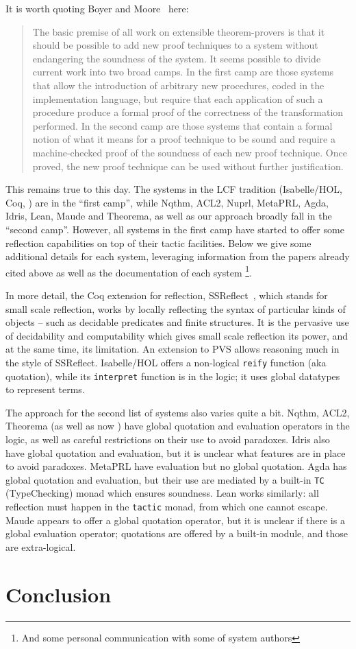\documentclass[fleqn]{llncs}
\begin{document}
It is worth quoting Boyer and Moore~\cite{BoyerMoore81} here:
\begin{quote}
The basic premise of all work on extensible
theorem-provers is that it should be possible to add new proof
techniques to a system without endangering the soundness of the system.
It seems possible to divide current work into two broad camps. In the
first camp are those systems that allow the introduction of arbitrary
new procedures, coded in the implementation language, but require that
each application of such a procedure produce a formal proof of the
correctness of the transformation performed. In the second camp are
those systems that contain a formal notion of what it means for a proof
technique to be sound and require a machine-checked proof of the
soundness of each new proof technique. Once proved, the new proof
technique can be used without further justification. 
\end{quote}
This remains true to this day. The systems in the LCF tradition (Isabelle/HOL,
Coq, \HL) are in the ``first camp'',
while Nqthm, ACL2, Nuprl, MetaPRL, Agda, Idris, Lean, Maude and Theorema, 
as well as our approach broadly fall in the ``second camp''. However,
all systems in the first camp have started to offer some reflection
capabilities on top of their tactic facilities. Below we give some 
additional details for each system, leveraging information from the papers 
already cited above as well as the documentation of each system%
\footnote{And some personal communication with some of system authors}.

In more detail, the Coq extension for reflection,
\textrm{SSReflect}~\cite{gonthier2010introduction}, which stands
for \textsf{small scale reflection}, works by locally reflecting
the syntax of particular kinds of objects -- such as decidable
predicates and finite structures.  It is the pervasive use of
decidability and computability which gives small scale reflection
its power, and at the same time, its limitation.  An extension to
PVS allows reasoning much in the style of \textrm{SSReflect}.
Isabelle/HOL offers a non-logical \texttt{reify} function (aka
quotation), while its \texttt{interpret} function is in the logic;
it uses global datatypes to represent \HL terms.

The approach for the second list of systems also varies quite a bit.
Nqthm, ACL2, Theorema (as well as now \HLQE) have global quotation
and evaluation operators in the logic, as well as careful restrictions
on their use to avoid paradoxes. Idris also have global quotation and
evaluation, but it is unclear what features are in place to avoid
paradoxes. MetaPRL have evaluation but no global quotation. Agda
has global quotation and evaluation, but their use are mediated by
a built-in \texttt{TC} (TypeChecking) monad which ensures soundness.
Lean works similarly: all reflection must happen in the \texttt{tactic}
monad, from which one cannot escape. Maude appears to offer a global
quotation operator, but it is unclear if there is a global evaluation
operator; quotations are offered by a built-in module, and those are
extra-logical.

\section{Conclusion}\label{sec:conclusion}




\setcounter{tocdepth}{1}
\listoftodos
\setcounter{tocdepth}{0}
\end{document}
